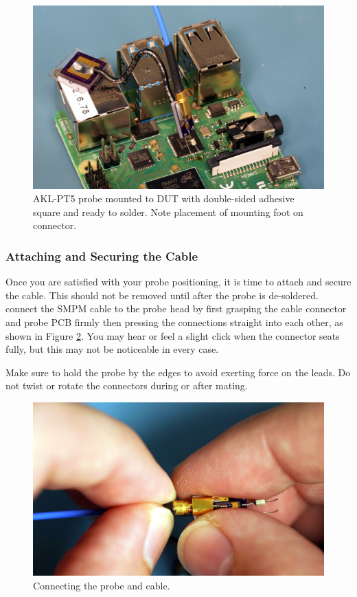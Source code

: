 \documentclass[11pt]{article}
\begin{document}
\begin{figure}[h]
\centering
\includegraphics[width=12cm]{placement.jpg}
\caption{AKL-PT5 probe mounted to DUT with double-sided adhesive square and ready to solder.
Note placement of mounting foot on connector.}
\label{placement}
\end{figure}

\FloatBarrier

\subsubsection{Attaching and Securing the Cable}

Once you are satisfied with your probe positioning, it is time to attach and secure the cable. This should not be 
removed until after the probe is de-soldered. connect the SMPM cable to the probe head by first grasping the cable
connector and probe PCB firmly then pressing the connections straight into each other, as shown in Figure \ref{smpm-mating}. 
You may hear or feel a slight click when the connector seats fully, but this may not be noticeable in every case.

Make sure to hold the probe by the edges to avoid exerting force on the leads. Do not twist or rotate the connectors
during or after mating.

\begin{figure}[h]
\centering
\includegraphics[width=12cm]{smpm-mating.jpg}
\caption{Connecting the probe and cable.}
\label{smpm-mating}
\end{figure}
\end{document}
